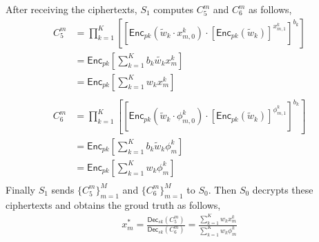 \documentclass[conference]{IEEEtran}
\begin{document}
After receiving the ciphertexts, $S_1$ computes $C_5^m$ and $C_6^m$ as follows,
\begin{equation}
  \begin{split}
    C_5^m & = \prod_{k=1}^K\left[\left[\mathsf{Enc}_{pk}\left(\tilde{w}_k\cdot x_{m,0}^k\right)\cdot \left[\mathsf{Enc}_{pk}\left(\tilde{w}_k\right)\right]^{x_{m,1}^k}\right]^{b_k} \right] \\
    & = \mathsf{Enc}_{pk}\left[\sum_{k=1}^K b_k \tilde{w_k}x_m^k\right]\\
    & = \mathsf{Enc}_{pk}\left[\sum_{k=1}^K w_kx_m^k\right] \\
  \end{split}
\end{equation}
\begin{equation}
  \begin{split}
    C_6^m & = \prod_{k=1}^K \left[ \left[ \mathsf{Enc}_{pk}(\tilde{w}_k\cdot \phi_{m,0}^k) \cdot \left[\mathsf{Enc}_{pk}(\tilde{w}_k)\right]^{\phi_{m,1}^k}\right]^{b_k} \right] \\
     & = \mathsf{Enc}_{pk}\left[\sum_{k=1}^K b_k \tilde{w}_k\phi_m^k \right] \\
     & = \mathsf{Enc}_{pk}\left[\sum_{k=1}^K w_k\phi_m^k \right] \\
  \end{split}
\end{equation}
Finally $S_1$ sends $\{C_5^m\}_{m=1}^M$ and $\{C_6^m\}_{m=1}^M$ to $S_0$.
Then $S_0$ decrypts these ciphertexts and obtains the groud truth as follows,
\begin{equation}
  \begin{split}
    x_m^* = \frac{\mathsf{Dec}_{sk}(C_5^m)}{\mathsf{Dec}_{sk}(C_6^m)} = \frac{\sum_{k=1}^K w_kx_m^k}{\sum_{k=1}^K w_k\phi_m^k}
  \end{split}
\end{equation}
\end{document}
